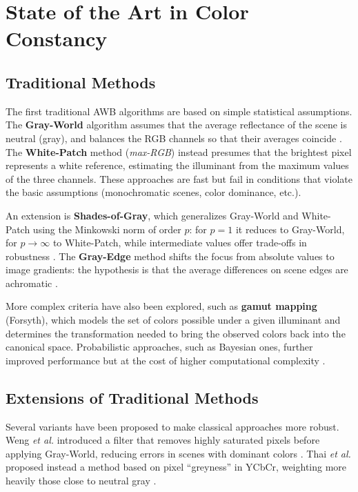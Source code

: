 
\chapter{State of the Art in Color Constancy}

\section{Traditional Methods}

The first traditional AWB algorithms are based on simple statistical assumptions. The \textbf{Gray-World} algorithm assumes that the average reflectance of the scene is neutral (gray), and balances the RGB channels so that their averages coincide \cite{zapryanov_automatic_2012}. The \textbf{White-Patch} method (\textit{max-RGB}) instead presumes that the brightest pixel represents a white reference, estimating the illuminant from the maximum values of the three channels. These approaches are fast but fail in conditions that violate the basic assumptions (monochromatic scenes, color dominance, etc.).

An extension is \textbf{Shades-of-Gray}, which generalizes Gray-World and White-Patch using the Minkowski norm of order $p$: for $p=1$ it reduces to Gray-World, for $p\to \infty$ to White-Patch, while intermediate values offer trade-offs in robustness \cite{zapryanov_automatic_2012}. The \textbf{Gray-Edge} method shifts the focus from absolute values to image gradients: the hypothesis is that the average differences on scene edges are achromatic \cite{van_de_weijer_edge-based_2007}. 

More complex criteria have also been explored, such as \textbf{gamut mapping} (Forsyth), which models the set of colors possible under a given illuminant and determines the transformation needed to bring the observed colors back into the canonical space. Probabilistic approaches, such as Bayesian ones, further improved performance but at the cost of higher computational complexity \cite{gehler_bayesian_2008}.

\section{Extensions of Traditional Methods}

Several variants have been proposed to make classical approaches more robust. Weng \textit{et al.} introduced a filter that removes highly saturated pixels before applying Gray-World, reducing errors in scenes with dominant colors \cite{weng_novel_2005}. Thai \textit{et al.} proposed instead a method based on pixel “greyness” in YCbCr, weighting more heavily those close to neutral gray \cite{thai_fast_2016}. 

